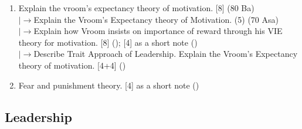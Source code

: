 \documentclass[12pt]{article}
\newcommand{\lb}{\\$\left|\rightarrow\right.$}
\begin{document}
\begin{enumerate}[topsep=0pt, noitemsep]
      \item Explain the vroom's expectancy theory of motivation. \hfill [8] (80 Ba)
        \lb Explain the Vroom's Expectancy theory of Motivation. \hfill (5) (70 Asa)
        \lb Explain how Vroom insists on importance of reward through his VIE theory for motivation. \hfill [8] (); [4] as a short note ()
        \lb Describe Trait Approach of Leadership. Explain the Vroom's Expectancy theory of motivation. \hfill [4+4] ()

      \item Fear and punishment theory. \hfill [4] as a short note ()
    \end{enumerate}

  \subsection{Leadership}
\end{document}
